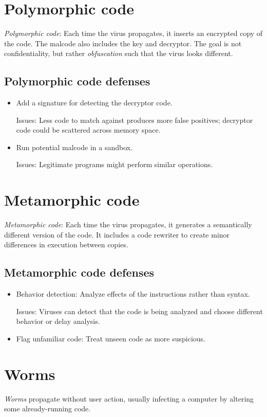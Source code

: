 \section{Polymorphic code}
\emph{Polymorphic code}: Each time the virus propagates, it inserts an encrypted copy of the code. The malcode also includes the key and decryptor. The goal is not confidentiality, but rather \emph{obfuscation} such that the virus looks different.

\subsection{Polymorphic code defenses}
\begin{itemize}
    \item Add a signature for detecting the decryptor code.

    Issues: Less code to match against produces more false positives; decryptor code could be scattered across memory space.

    \item Run potential malcode in a sandbox.

    Issues: Legitimate programs might perform similar operations.
\end{itemize}

\section{Metamorphic code}
\emph{Metamorphic code}: Each time the virus propagates, it generates a semantically different version of the code. It includes a code rewriter to create minor differences in execution between copies.

\subsection{Metamorphic code defenses}
\begin{itemize}
    \item Behavior detection: Analyze effects of the instructions rather than syntax.
    
    Issues: Viruses can detect that the code is being analyzed and choose different behavior or delay analysis.

    \item Flag unfamiliar code: Treat unseen code as more suspicious.
\end{itemize}

\section{Worms}
\emph{Worms} propagate without user action, usually infecting a computer by altering some already-running code.

